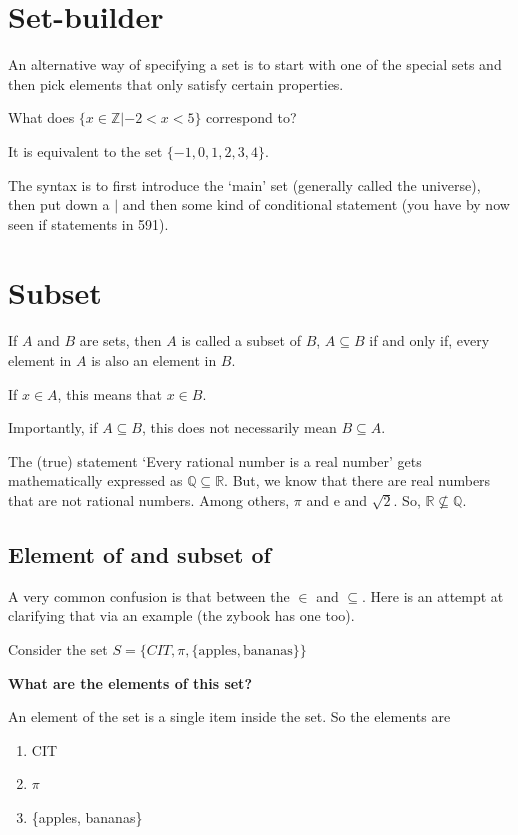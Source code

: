 \documentclass[12pt]{article}
\begin{document}
\section*{Set-builder}

An alternative way of specifying a set is to start with one of the special sets and then pick elements that only satisfy certain properties.

\medskip
What does $\{x \in \mathbb{Z}|-2 < x < 5\}$ correspond to?

It is equivalent to the set $\{-1, 0, 1, 2, 3, 4\}$.

\medskip

The syntax is to first introduce the `main' set (generally called the universe), then put down a $|$ and then some kind of conditional statement (you have by now seen if statements in 591). 

\section*{Subset}
If $A$ and $B$ are sets, then $A$ is called a subset of $B$, $A \subseteq B$  if and only if, every element in $A$ is also an element in $B$.

If $x \in A$, this means that $x \in B$.

Importantly, if $A \subseteq B$, this does not necessarily mean $B \subseteq A$. 

The (true) statement `Every rational number is a real number' gets mathematically expressed as $\mathbb{Q} \subseteq \mathbb{R}$. But, we know that there are real numbers that are not rational numbers. Among others, $\pi$ and e and $\sqrt{2}$. So, $\mathbb{R} \not \subseteq \mathbb{Q}$.

\subsection*{Element of and subset of}

A very common confusion is that between the $\in$ and $\subseteq$. Here is an attempt at clarifying that via an example (the zybook has one too).

\medskip

Consider the set $S = \{CIT, \pi , \{\text{apples}, \text{bananas} \} \}$

\textbf{What are the elements of this set?}

An element of the set is a single item inside the set. So the elements are

\begin{enumerate}
\item CIT
\item $\pi$
\item \{apples, bananas\}
\end{enumerate}
\end{document}
